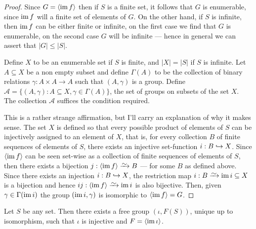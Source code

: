 \begin{proof}
  Since \(G = \left\langle \operatorname{im} f \right\rangle\) then if \(S\) is a finite set, it follows
  that \(G\) is enumerable, since \(\operatorname{im} f\) will a finite set of elements of
  \(G\). On the other hand, if \(S\) is infinite, then \(\operatorname{im} f\) can be either
  finite or infinite, on the first case we find that \(G\) is enumerable, on the
  second case \(G\) will be infinite --- hence in general we can assert that \(|G|
  \leq |S|\).

  Define \(X\) to be an enumerable set if \(S\) is finite, and \(|X| = |S|\) if
  \(S\) is infinite. Let \(A \subseteq X\) be a non empty subset and define \(\Gamma(A)\) to
  be the collection of binary relations \(\gamma: A \times A \to A\) such that \((A, \gamma)\) is
  a group. Define \(\mathcal{A} = \{(A, \gamma): A \subseteq X, \gamma \in \Gamma(A)\}\), the set of groups on
  subsets of the set \(X\). The collection \(\mathcal{A}\) suffices the condition
  required.

  This is a rather strange affirmation, but I'll carry an explanation of why it
  makes sense. The set \(X\) is defined so that every possible product of
  elements of \(S\) can be injectively assigned to an element of \(X\), that is,
  for every collection \(B\) of finite sequences of elements of \(S\), there
  exists an injective set-function \(i: B \hookrightarrow X\). Since \(\left\langle \operatorname{im} f
  \right\rangle\) can be seen set-wise as a collection of finite sequences of elements
  of \(S\), then there exists a bijection \(j: \left\langle \im f \right\rangle \isoto B\) ---
  for some \(B\) as defined above. Since there exists an injection \(i: B \hookrightarrow
  X\), the restriction map \(i: B \isoto \im i \subseteq X\) is a bijection and hence
  \(ij: \left\langle \im f \right\rangle \isoto \im i\) is also bijective. Then, given \(\gamma \in
  \Gamma(\operatorname{im} i)\) the group \((\operatorname{im} i, \gamma)\) is isomorphic to \(\left\langle \operatorname{im} f \right\rangle =
  G\).
\end{proof}

\begin{proposition}
  \label{prop:universal-free-group}
  Let \(S\) be any set. Then there exists a free group \((\iota, F(S))\), unique up
  to isomorphism, such that \(\iota\) is injective and \(F = \left\langle \operatorname{im} \iota \right\rangle\).
\end{proposition}

